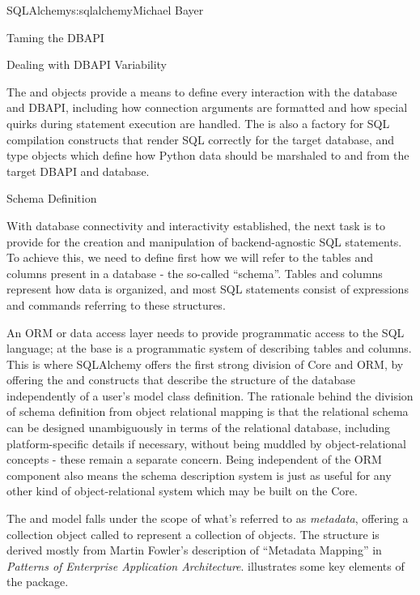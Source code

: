 \begin{aosachapter}{SQLAlchemy}{s:sqlalchemy}{Michael Bayer}
\begin{aosasect1}{Taming the DBAPI}
\begin{aosasect2}{Dealing with DBAPI Variability}

The  and  objects provide a means
to define every interaction with the database and DBAPI,
including how connection arguments are formatted and how special
quirks during statement execution are handled. The 
is also a factory for SQL compilation constructs that render
SQL correctly for the target database, and type objects which
define how Python data should be marshaled to and from the target
DBAPI and database.

\end{aosasect2}

\end{aosasect1}

\begin{aosasect1}{Schema Definition}

With database connectivity and interactivity established, the next task
is to provide for the creation and manipulation of backend-agnostic
SQL statements.  To achieve this, we need to define first how we will
refer to the tables and columns present in a database - the so-called
``schema''.  Tables and columns represent how data
is organized, and most SQL statements consist of expressions and
commands referring to these structures.

An ORM or data access layer needs to provide programmatic access to the SQL
language; at the base is a programmatic system of describing tables and
columns. This is where SQLAlchemy offers the first strong division of Core
and ORM, by offering the  and  constructs that describe
the structure of the database independently of a user's model class
definition.  The rationale behind the division of schema definition from object
relational mapping is that the relational schema can be designed
unambiguously in terms of the relational database, including platform-specific
details if necessary, without being muddled by object-relational concepts -
these remain a separate concern. Being independent of the ORM component also
means the schema description system is just as useful for any other kind of
object-relational system which may be built on the Core.

The  and  model falls under the scope of what's
referred to as \emph{metadata}, offering a collection object called  to represent
a collection of  objects.  The structure is derived
mostly from Martin Fowler's description of ``Metadata Mapping'' in
\emph{Patterns of Enterprise Application Architecture}. %
 illustrates
some key elements of the  package.


\end{aosasect1}
\end{aosachapter}
